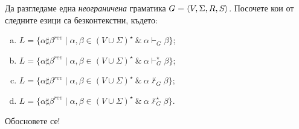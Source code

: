 \begin{problem}
  Да разгледаме една {\em неограничена} граматика $G = \langle{V,\Sigma,R,S}\rangle$.
  Посочете кои от следните езици са безконтекстни, където:
  \begin{enumerate}[a)]
  \item 
    $L = \{\alpha\sharp\beta^{rev} \mid \alpha,\beta \in (V \cup \Sigma)^\star\ \&\ \alpha \vdash_G \beta\}$;
  \item 
    $L = \{\alpha\sharp\beta^{rev} \mid \alpha,\beta \in (V \cup \Sigma)^\star\ \&\ \alpha \vdash^\star_G \beta\}$;
  \item
    $L = \{\alpha\sharp\beta^{rev} \mid \alpha,\beta \in (V \cup \Sigma)^\star\ \&\ \alpha \not\vdash_G \beta\}$;
  \item
    $L = \{\alpha\sharp\beta^{rev} \mid \alpha,\beta \in (V \cup \Sigma)^\star\ \&\ \alpha \not\vdash^\star_G \beta\}$.
  \end{enumerate}
  Обосновете се!
\end{problem}



